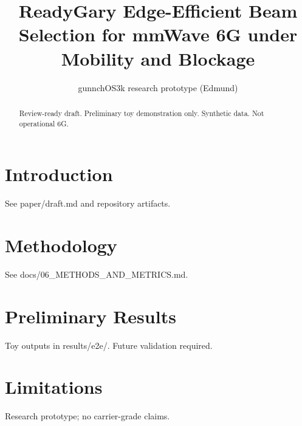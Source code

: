 \documentclass{article}
\title{ReadyGary Edge-Efficient Beam Selection for mmWave 6G under Mobility and Blockage}
\author{gunnchOS3k research prototype (Edmund)}
\begin{document}
\maketitle
\begin{abstract}
Review-ready draft. Preliminary toy demonstration only. Synthetic data. Not operational 6G.
\end{abstract}
\section{Introduction}
See paper/draft.md and repository artifacts.
\section{Methodology}
See docs/06\_METHODS\_AND\_METRICS.md.
\section{Preliminary Results}
Toy outputs in results/e2e/. Future validation required.
\section{Limitations}
Research prototype; no carrier-grade claims.


\end{document}
